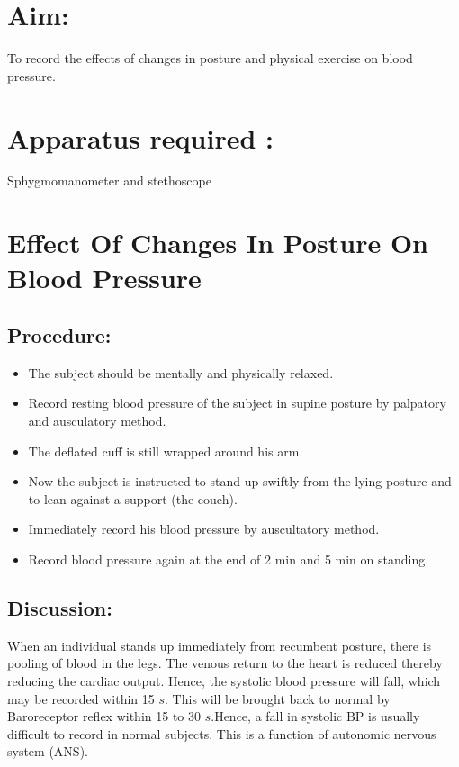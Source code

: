 \documentclass[a4paper,12pt,openany,oneside]{book}
\begin{document}
\section*{Aim:}
	To record the effects of changes in posture and physical exercise on blood pressure.
	\section*{Apparatus required :}
	Sphygmomanometer and stethoscope
	\section*{Effect Of Changes In Posture On Blood Pressure}
	\subsection*{Procedure:}
	\begin{itemize}
\item{The subject should be mentally and physically relaxed.}
\item{Record resting blood pressure of the subject in supine posture by palpatory and ausculatory method.}
\item{The deflated cuff is still wrapped around his arm.}
\item{Now the subject is instructed to stand up swiftly from the lying posture and to lean against a support (the couch).}
\item{Immediately record his blood pressure by auscultatory method.}
\item{Record blood pressure again at the end of 2 min and 5 min on standing.}
	\end{itemize}
	\subsection*{Discussion:}
		When an individual stands up immediately from recumbent posture, there is pooling of blood in the legs.
		The venous return to the heart is reduced thereby reducing the cardiac output. Hence, the systolic blood pressure will fall, which may be recorded within 15 $s$. This will be brought back to normal by Baroreceptor reflex within 15 to 30 $s$.Hence, a fall in systolic BP is usually difficult to record in normal subjects.
		This is a function of autonomic nervous system (ANS).
\end{document}
